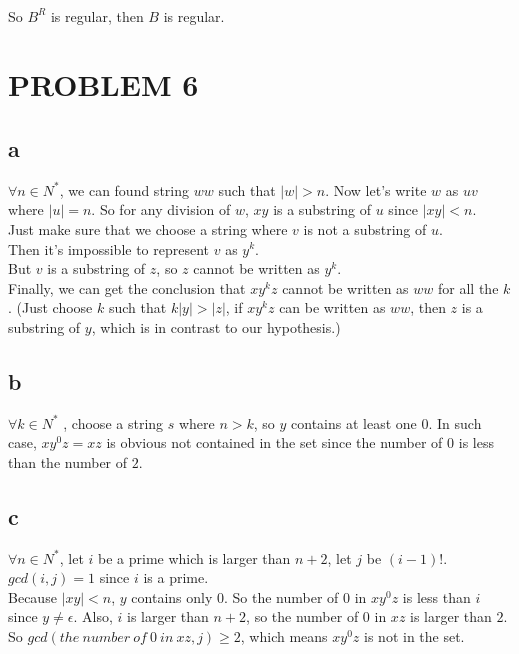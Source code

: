 \documentclass{ctexart}
\begin{document}
\\

So $B^R$ is regular, then $B$ is regular.

\section{PROBLEM 6}
\subsection{a}
$\forall n \in N^* $, we can found string $ww$ such that $|w|>n$.
Now let's write $w$ as $uv$ where $|u|=n$. So for any division of
$w$, $xy$ is a substring of $u$ since $|xy|<n$.\\
Just make sure that we choose a string where $v$ is not a substring of $u$.\\
Then it's impossible to represent $v$ as $y^k$.\\
But $v$ is a substring of $z$, so $z$ cannot be written as $y^k$.\\
Finally, we can get the conclusion that $xy^kz$ cannot be
written as $ww$ for all the $k$. (Just choose $k$ such that
$k|y|>|z|$, if $xy^kz$ can be written as $ww$, then $z$ is a substring of $y$,
which is in contrast to our hypothesis.)

\subsection{b}
$\forall k \in N^* $ , choose a string $s$ where $n>k$, so $y$ contains at least one
$0$. In such case, $xy^0z=xz$ is obvious not contained in the set since the number
of $0$ is less than the number of $2$.

\subsection{c}
$\forall n \in N^*$, let $i$ be a prime which is larger than $n+2$, let $j$ be $(i-1)!$.\\
$gcd(i,j)=1$ since $i$ is a prime.\\
Because $|xy|<n$, $y$ contains only $0$. So the number of $0$ in $xy^0z$ is less than
$i$ since $y \ne \epsilon$. Also, $i$ is larger than $n+2$, so the number of $0$ in $xz$ is larger
than $2$.\\
So $gcd(the\ number\ of\ 0\ in\ xz, j) \geq 2$, which means $xy^0z$ is not in the set.
\end{document}

